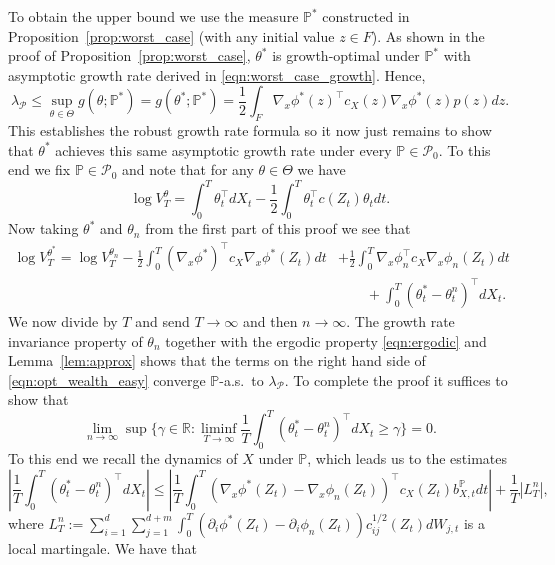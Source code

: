 \documentclass{article}
\makeatletter
\theoremstyle{plain}
\theoremstyle{definition}
\newcommand{\R}{\mathbb{R}}
\renewcommand{\P}{\mathbb{P}}
\newcommand{\Pcal}{{\mathcal P}}
\numberwithin{lem}{section}
\renewenvironment{proof}[1][\proofname] {\par\pushQED{\qed}\normalfont\topsep6\p@\@plus6\p@\relax\trivlist\item[\hskip\labelsep\bfseries#1\@addpunct{.}]\ignorespaces}{\popQED\endtrivlist\@endpefalse}
\makeatother
\begin{document}
\begin{proof}[Proof of Theorem~\ref{thm:main}]
To obtain the upper bound we use the measure $\P^*$ constructed in Proposition~\ref{prop:worst_case} (with any initial value $z \in F$). As shown in the proof of Proposition~\ref{prop:worst_case}, $\theta^*$ is growth-optimal under $\P^*$ with asymptotic growth rate derived in \eqref{eqn:worst_case_growth}. Hence,
\[\lambda_{\Pcal} \leq  \sup_{\theta \in \Theta} g(\theta;\P^*) = g(\theta^*;\P^*) = \frac{1}{2}\int_F \nabla_x \phi^*(z)^\top c_X(z)\nabla_x \phi^*(z)p(z)dz.\]
This establishes the robust growth rate formula so it now just remains to show that $\theta^*$ achieves this same asymptotic growth rate under every $\P \in \Pcal_0$. To this end we fix $\P \in \Pcal_0$ and note that for any $\theta \in \Theta$ we have
\[\log V^\theta_T = \int_0^T \theta_t^\top dX_t - \frac{1}{2}\int_0^T \theta_t^\top c(Z_t)\theta_t dt.\] Now taking $\theta^*$ and $\theta_n$ from the first part of this proof we see that
\begin{align} \log V_T^{\theta^*} = \log V_T^{\theta_n}    - \frac{1}{2}\int_0^T (\nabla_x \phi^*)^\top c_X\nabla_x \phi^*(Z_t)dt & + \frac{1}{2} \int_0^T \nabla_x \phi_n^\top c_X\nabla_x  \phi_n(Z_t)dt \qquad \label{eqn:opt_wealth_easy} \\ & \qquad   + \int_0^T(\theta^*_t - \theta^n_t)^\top dX_t \label{eqn:opt_wealth_hard}.
\end{align}
We now divide by $T$ and send $T \to \infty$ and then $n \to \infty$. The growth rate invariance property of $\theta_n$ together with the ergodic property \eqref{eqn:ergodic} and Lemma~\ref{lem:approx} shows that the terms on the right hand side of \eqref{eqn:opt_wealth_easy} converge $\P$-a.s.\ to $\lambda_{\Pcal}$. To complete the proof it suffices to show that
\begin{equation} \label{eqn:stoch_int_growth}
  \lim_{n \to \infty}\sup\Big\{\gamma \in \R: \liminf_{T \to \infty} \frac{1}{T}\int_0^T(\theta^*_t - \theta_t^n)^\top dX_t\geq \gamma \Big\} = 0.
\end{equation}
To this end we recall the dynamics of $X$ under $\P$, which leads us to the estimates
\begin{equation} \label{eqn:stoch_int_bound}
\left|\frac{1}{T}\int_0^T (\theta^*_t - \theta^n_t)^\top dX_t\right| \leq\left|\frac{1}{T}\int_0^T (\nabla_x\phi^*(Z_t)-\nabla_x \phi_n(Z_t))^\top c_X(Z_t) b^\P_{X,t}dt\right| +\frac{1}{T}|L^n_T|, 
\end{equation}
where $L^n_T := \sum_{i=1}^d\sum_{j=1}^{d+m}\int_0^T (\partial_i\phi^*(Z_t)-\partial_i \phi_n(Z_t)) c^{1/2}_{ij}(Z_t)dW_{j,t}$ is a local martingale. We have that 

\end{proof}
\end{document}
